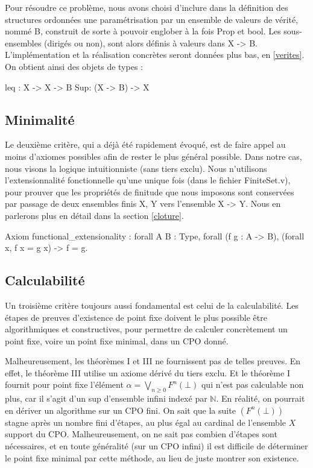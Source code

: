 \documentclass{article}
\newcommand\code[1]{{\fontfamily{lmtt}\selectfont #1}}
\theoremstyle{definition}
\begin{document}
Pour résoudre ce problème, nous avons choisi d'inclure dans la définition des structures ordonnées une paramétrisation par un ensemble de valeurs de vérité, nommé \code{B}, construit de sorte à pouvoir englober à la fois \code{Prop} et \code{bool}. Les sous-ensembles (dirigés ou non), sont alors définis à valeurs dans \code{X -> B}. L'implémentation et la réalisation concrètes seront données plus bas, en \ref{verites}. On obtient ainsi des objets de types :

\begin{coq}
leq : X -> X -> B
Sup: (X -> B) -> X
\end{coq}


\subsection{Minimalité}

Le deuxième critère, qui a déjà été rapidement évoqué, est de faire appel au moins d'axiomes possibles afin de rester le plus général possible. Dans notre cas, nous visons la logique intuitionniste (sans tiers exclu). Nous n'utilisons l'extensionnalité fonctionnelle qu'une unique fois (dans le fichier \code{FiniteSet.v}), pour prouver que les propriétés de finitude que nous imposons sont conservées par passage de deux ensembles finis \code{X, Y} vers l'ensemble \code{X -> Y}. Nous en parlerons plus en détail dans la section \ref{cloture}.


\label{funext}
\begin{coq}
Axiom functional_extensionality : forall {A B : Type},
  forall (f g : A -> B),
  (forall x, f x = g x) -> f = g.
\end{coq}

\subsection{Calculabilité}
\label{calculabilite}

Un troisième critère toujours aussi fondamental est celui de la calculabilité. Les étapes de preuves d'existence de point fixe doivent le plus possible être algorithmiques et constructives, pour permettre de calculer concrètement un point fixe, voire un point fixe minimal, dans un CPO donné.

Malheureusement, les théorèmes I et III ne fournissent pas de telles preuves. En effet, le théorème III utilise un axiome dérivé du tiers exclu. Et le théorème I fournit pour point fixe l'élément $ \alpha = \bigvee_{n \geq 0} F^n(\bot)$ qui n'est pas calculable non plus, car il s'agit d'un sup d'ensemble infini indexé par $\mathbb{N}$. En réalité, on pourrait en dériver un algorithme sur un CPO fini. On sait que la suite $(F^n(\bot))$ stagne après un nombre fini d'étapes, au plus égal au cardinal de l'ensemble $X$ support du CPO. Malheureusement, on ne sait pas combien d'étapes sont nécessaires, et en toute généralité (sur un CPO infini) il est difficile de déterminer le point fixe minimal par cette méthode, au lieu de juste montrer son existence.
\end{document}
